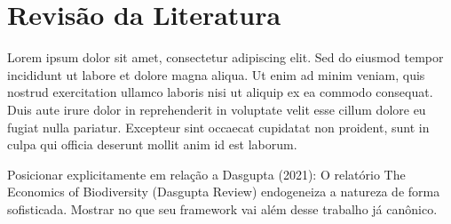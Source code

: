 \section{Revisão da Literatura}

Lorem ipsum dolor sit amet, consectetur adipiscing elit. Sed do eiusmod tempor incididunt ut labore et dolore magna aliqua. Ut enim ad minim veniam, quis nostrud exercitation ullamco laboris nisi ut aliquip ex ea commodo consequat. Duis aute irure dolor in reprehenderit in voluptate velit esse cillum dolore eu fugiat nulla pariatur. Excepteur sint occaecat cupidatat non proident, sunt in culpa qui officia deserunt mollit anim id est laborum.

Posicionar explicitamente em relação a Dasgupta (2021): O relatório The Economics of Biodiversity (Dasgupta Review) endogeneiza a natureza de forma sofisticada. Mostrar no que seu framework vai além desse trabalho já canônico.



